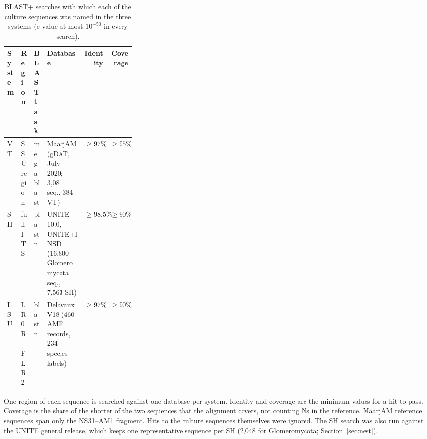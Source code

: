 \begin{table}[htbp]\centering
\begin{threeparttable}
\caption{BLAST+ searches with which each of the \NCopiesRetained{} culture sequences was named in the three systems (e-value at most $10^{-50}$ in every search).}
\label{tab:arms}
\small
\begin{tabular}{lllp{0.30\linewidth}rr}
\toprule
System & Region & BLAST task & Database & Identity & Coverage\\
\midrule
VT  & SSU region  & megablast & MaarjAM (gDAT, July 2020; 3{,}081 seq., 384 VT) & $\ge97\%$   & $\ge95\%$\\
SH  & full ITS   & blastn & UNITE 10.0, UNITE+INSD (16{,}800 Glomeromycota seq., 7{,}563 SH) & $\ge98.5\%$ & $\ge90\%$\\
LSU & LR0R--FLR2 & blastn & Delavaux V18 (460 AMF records, 234 species labels) & $\ge97\%$ & $\ge90\%$\\
\bottomrule
\end{tabular}
\begin{tablenotes}\footnotesize
\item One region of each sequence is searched against one database per system. Identity and coverage are the
minimum values for a hit to pass. Coverage is the share of the shorter of the two sequences that the alignment
covers, not counting Ns in the reference. MaarjAM reference sequences span only the NS31--AM1 fragment. Hits to the
culture sequences themselves were ignored. The SH search was also run against the UNITE general release, which
keeps one representative sequence per SH (2{,}048 for Glomeromycota; Section~\ref{sec:nest}).
\end{tablenotes}
\end{threeparttable}
\end{table}
